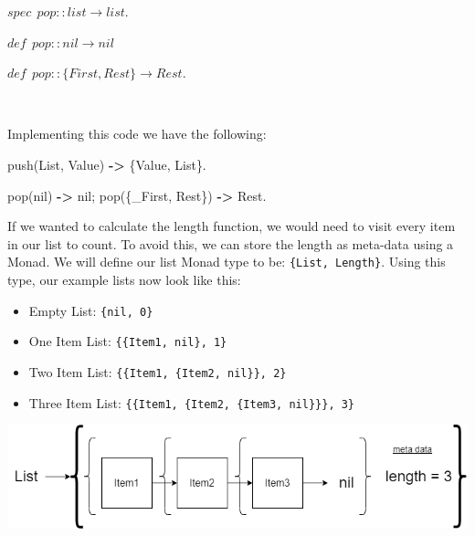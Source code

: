 \documentclass[
]{book}
\newenvironment{Shaded}{\begin{snugshade}}{\end{snugshade}}
\newcommand{\CharTok}[1]{\textcolor[rgb]{0.31,0.60,0.02}{#1}}
\newcommand{\FunctionTok}[1]{\textcolor[rgb]{0.00,0.00,0.00}{#1}}
\newcommand{\OperatorTok}[1]{\textcolor[rgb]{0.81,0.36,0.00}{\textbf{#1}}}
\newcommand{\VariableTok}[1]{\textcolor[rgb]{0.00,0.00,0.00}{#1}}
\providecommand{\tightlist}{%
  \setlength{\itemsep}{0pt}\setlength{\parskip}{0pt}}
\begin{document}
\begin{formulabox}
\(spec ~ ~ pop :: list \rightarrow list.\)

\(de\mathit{f} ~ ~ pop :: nil \rightarrow nil\)

\(de\mathit{f} ~ ~ pop :: \lbrace First, Rest \rbrace \rightarrow Rest.\)

\end{formulabox}

\(\nonumber\)

Implementing this code we have the following:

\begin{Shaded}
\begin{Highlighting}[]
\FunctionTok{push(}\VariableTok{List}\FunctionTok{,} \VariableTok{Value}\FunctionTok{)} \OperatorTok{{-}\textgreater{}} \FunctionTok{\{}\VariableTok{Value}\FunctionTok{,} \VariableTok{List}\FunctionTok{\}.}

\FunctionTok{pop(}\CharTok{nil}\FunctionTok{)} \OperatorTok{{-}\textgreater{}} \CharTok{nil}\FunctionTok{;}
\FunctionTok{pop(\{}\VariableTok{\_First}\FunctionTok{,} \VariableTok{Rest}\FunctionTok{\})} \OperatorTok{{-}\textgreater{}} \VariableTok{Rest}\FunctionTok{.}
\end{Highlighting}
\end{Shaded}

If we wanted to calculate the length function, we would need to visit every item in our list to count. To avoid this, we can store the length as meta-data using a Monad. We will define our list Monad type to be: \texttt{\{List,\ Length\}}. Using this type, our example lists now look like this:

\begin{itemize}
\tightlist
\item
  Empty List: \texttt{\{nil,\ 0\}}
\item
  One Item List: \texttt{\{\{Item1,\ nil\},\ 1\}}
\item
  Two Item List: \texttt{\{\{Item1,\ \{Item2,\ nil\}\},\ 2\}}
\item
  Three Item List: \texttt{\{\{Item1,\ \{Item2,\ \{Item3,\ nil\}\}\},\ 3\}}
\end{itemize}

\includegraphics{images/ThreeItemCustomListMonad.drawio.png}
\end{document}
